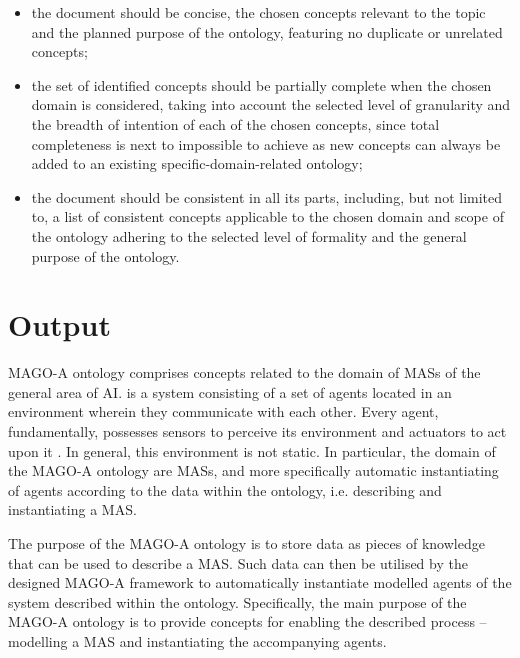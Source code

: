 \begin{itemize}
    \item the document should be concise, the chosen concepts relevant to the topic and the planned purpose of the ontology, featuring no duplicate or unrelated concepts;

    \item the set of identified concepts should be partially complete when the chosen domain is considered, taking into account the selected level of granularity and the breadth of intention of each of the chosen concepts, since total completeness is next to impossible to achieve as new concepts can always be added to an existing specific-domain-related ontology;

    \item the document should be consistent in all its parts, including, but not limited to, a list of consistent concepts applicable to the chosen domain and scope of the ontology adhering to the selected level of formality and the general purpose of the ontology.
\end{itemize}



\section{Output}

MAGO-A ontology%
comprises concepts related to the domain of \acp{MAS} of the general area of \ac{AI}.  is a system consisting of a set of agents located in an environment wherein they communicate with each other. Every agent, fundamentally, possesses sensors to perceive its environment and actuators to act upon it \cite[p. 54]{russell2022ArtificialIntelligenceModern}. In general, this environment is not static. In particular, the domain of the MAGO-A ontology are \acp{MAS}, and more specifically automatic instantiating of agents according to the data within the ontology, i.e. describing and instantiating a \ac{MAS}.

The purpose%
of the MAGO-A ontology is to store data as pieces of knowledge that can be used to describe a \ac{MAS}. Such data can then be utilised by the designed MAGO-A framework to automatically instantiate modelled agents of the system described within the ontology. Specifically, the main purpose of the MAGO-A ontology is to provide concepts for enabling the described process -- modelling a \ac{MAS} and instantiating the accompanying agents.


